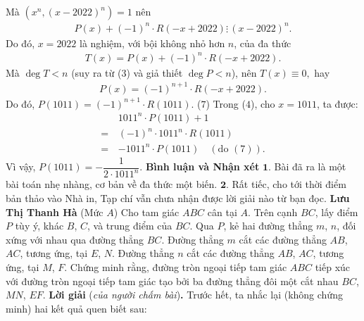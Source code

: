 \begin{multicols}{2}
	Mà  $\left( {{x^n},{{\left( {x - 2022} \right)}^n}} \right) = 1$ nên
	\begin{align*}
		P\left( x \right) + {\left( { - 1} \right)^n} \cdot R\left( { - x + 2022} \right) \vdots\, {\left( {x - 2022} \right)^n}.
	\end{align*}
	Do đó, $x = 2022$ là nghiệm, với bội không nhỏ hơn $n$, của đa thức
	\begin{align*}
		T\left( x \right) = P\left( x \right) + {\left( { - 1} \right)^n} \cdot R\left( { - x + 2022} \right).
	\end{align*}
	Mà $\deg T < n$  (suy ra từ ($3$) và giả thiết  $\deg P < n$), nên $T\left( x \right) \equiv 0,$  hay
	\begin{align*}
		P\left( x \right) = {\left( { - 1} \right)^{n + 1}} \cdot R\left( { - x + 2022} \right).
	\end{align*}
	Do đó, $P\left( {1011} \right) = {\left( { - 1} \right)^{n + 1}} \cdot R\left( {1011} \right)$. \hfill ($7$)
	\vskip 0.05cm
	Trong ($4$), cho $x = 1011$, ta được:
	\begin{align*}
		&{1011^n} \cdot P\left( {1011} \right) + 1 \\
		= \,&{\left( { - 1} \right)^n} \cdot {1011^n} \cdot R\left( {1011} \right)\\ 
		=  &- {1011^n} \cdot P\left( {1011} \right) \quad\left(\text{do }(7) \right).
	\end{align*}
	Vì vậy, $P\left( {1011} \right) =  - \dfrac{1}{{2 \cdot {{1011}^n}}}$.
	\vskip 0.05cm  
	\textbf{\color{thachthuctoanhoc}Bình luận và Nhận xét}
	\vskip 0.05cm
	$\pmb{1.}$ Bài đã ra là một bài toán nhẹ nhàng, cơ bản về đa thức một biến.
	\vskip 0.05cm
	$\pmb{2.}$ Rất tiếc, cho tới thời điểm bản thảo vào Nhà in, Tạp chí vẫn chưa nhận được lời giải nào từ bạn đọc.
	\vskip 0.1cm
	\hfill\textbf{\color{thachthuctoanhoc}Lưu Thị Thanh Hà}
	\vskip 0.1cm
	{}
	(Mức $A$)
	Cho tam giác $ABC$ cân tại $A$. Trên cạnh $BC$, lấy điểm $P$ tùy ý, khác $B$, $C$, và trung điểm của $BC$. Qua $P$, kẻ hai đường thẳng $m$, $n$, đối xứng với nhau qua đường thẳng $BC$. Đường thẳng $m$ cắt các đường thẳng $AB$, $AC$, tương ứng, tại $E$, $N$. Đường thẳng $n$ cắt các đường thẳng $AB$, $AC$, tương ứng, tại $M$, $F$. Chứng minh rằng, đường tròn ngoại tiếp tam giác $ABC$ tiếp xúc với đường tròn ngoại tiếp tam giác tạo bởi ba đường thẳng đôi một cắt nhau $BC$, $MN$, $EF$.
	\vskip 0.05cm
	\textbf{\color{thachthuctoanhoc}Lời giải} (\textit{của người chấm bài})\textbf{\color{thachthuctoanhoc}.}
	\vskip 0.05cm
	Trước hết, ta nhắc lại (không chứng minh) hai kết quả quen biết sau:

\end{multicols}
